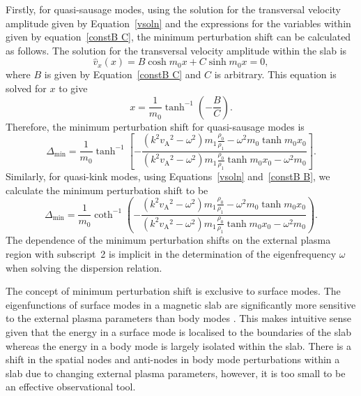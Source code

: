 Firstly, for quasi-sausage modes, using the solution for the transversal velocity amplitude given by Equation~\eqref{vsoln} and the expressions for the variables within given by equation~\eqref{constB C}, the minimum perturbation shift can be calculated as follows. The solution for the transversal velocity amplitude within the slab is
\begin{equation}
\widehat{v}_x(x) = B\cosh{m_0x} + C\sinh{m_0x} = 0,
\end{equation}
where $B$ is given by Equation~\eqref{constB C} and $C$ is arbitrary. This equation is solved for $x$ to give
\begin{equation}
x = \frac{1}{m_0} \tanh^{-1}\left(-\frac{B}{C}\right). \label{disp of min power saus}
\end{equation}
Therefore, the minimum perturbation shift for quasi-sausage modes is
\begin{equation}
\Delta_\textrm{min} = \frac{1}{m_0}\tanh^{-1}\left[-\frac{(k^2{v_\textrm{A}}^2 - \omega^2)m_1\frac{\rho_0}{\rho_1} - \omega^2{m_0}\tanh{m_0x_0}}{(k^2{v_\textrm{A}}^2 - \omega^2)m_1\frac{\rho_0}{\rho_1}\tanh{m_0x_0} - \omega^2{m_0}}\right]. \label{shift min saus}
\end{equation}
Similarly, for quasi-kink modes, using Equations~\eqref{vsoln} and~\eqref{constB B}, we calculate the minimum perturbation shift to be
\begin{equation}
\Delta_\textrm{min} = \frac{1}{m_0}\coth^{-1}\left(-\frac{(k^2{v_\textrm{A}}^2 - \omega^2)m_1\frac{\rho_0}{\rho_1} - \omega^2{m_0}\tanh{m_0x_0}}{(k^2{v_\textrm{A}}^2 - \omega^2)m_1\frac{\rho_0}{\rho_1}\tanh{m_0x_0} - \omega^2{m_0}}\right). \label{shift min kink}
\end{equation}
The dependence of the minimum perturbation shifts on the external plasma region with subscript~2 is implicit in the determination of the eigenfrequency $\omega$ when solving the dispersion relation.

The concept of minimum perturbation shift is exclusive to surface modes. The eigenfunctions of surface modes in a magnetic slab are significantly more sensitive to the external plasma parameters than body modes \citep{all_etal17}. This makes intuitive sense given that the energy in a surface mode is localised to the boundaries of the slab whereas the energy in a body mode is largely isolated within the slab. There is a shift in the spatial nodes and anti-nodes in body mode perturbations within a slab due to changing external plasma parameters, however, it is too small to be an effective observational tool.

